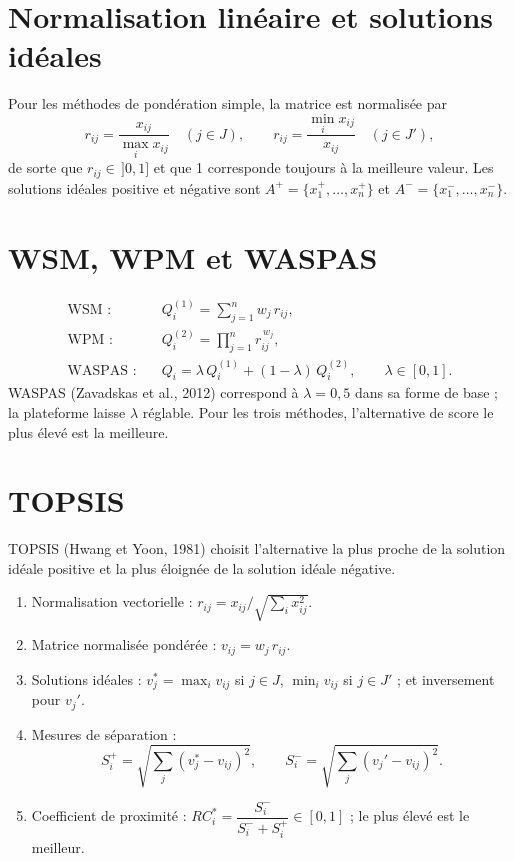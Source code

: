 \documentclass[11pt,a4paper]{report}
\theoremstyle{definition}
\theoremstyle{remark}
\begin{document}
\section{Normalisation linéaire et solutions idéales}

Pour les méthodes de pondération simple, la matrice est normalisée par
\begin{equation}
  r_{ij}=\frac{x_{ij}}{\max_i x_{ij}}\quad (j\in J),\qquad
  r_{ij}=\frac{\min_i x_{ij}}{x_{ij}}\quad (j\in J'),
\end{equation}
de sorte que $r_{ij}\in\,]0,1]$ et que 1 corresponde toujours à la meilleure valeur. Les solutions idéales
positive et négative sont $A^+=\{x_1^+,\dots,x_n^+\}$ et $A^-=\{x_1^-,\dots,x_n^-\}$.

\section{WSM, WPM et WASPAS}

\begin{align}
  \text{WSM :}\quad & Q_i^{(1)}=\sum_{j=1}^n w_j\,r_{ij},\\
  \text{WPM :}\quad & Q_i^{(2)}=\prod_{j=1}^n r_{ij}^{\,w_j},\\
  \text{WASPAS :}\quad & Q_i=\lambda\,Q_i^{(1)}+(1-\lambda)\,Q_i^{(2)},\qquad \lambda\in[0,1].
\end{align}
WASPAS (Zavadskas et al., 2012) correspond à $\lambda=0{,}5$ dans sa forme de base ; la plateforme laisse
$\lambda$ réglable. Pour les trois méthodes, l'alternative de score le plus élevé est la meilleure.

\section{TOPSIS}

TOPSIS (Hwang et Yoon, 1981) choisit l'alternative la plus proche de la solution idéale positive et la plus
éloignée de la solution idéale négative.
\begin{enumerate}
  \item Normalisation vectorielle : $r_{ij}=x_{ij}\big/\sqrt{\sum_i x_{ij}^2}$.
  \item Matrice normalisée pondérée : $v_{ij}=w_j\,r_{ij}$.
  \item Solutions idéales : $v_j^*=\max_i v_{ij}$ si $j\in J$, $\min_i v_{ij}$ si $j\in J'$ ; et
        inversement pour $v_j'$.
  \item Mesures de séparation :
  \begin{equation}
    S_i^+=\sqrt{\sum_j (v_j^*-v_{ij})^2},\qquad S_i^-=\sqrt{\sum_j (v_j'-v_{ij})^2}.
  \end{equation}
  \item Coefficient de proximité : $RC_i^*=\dfrac{S_i^-}{S_i^-+S_i^+}\in[0,1]$ ; le plus élevé est le
        meilleur.
\end{enumerate}
\end{document}
